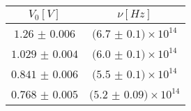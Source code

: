 \begin{tabular}{cc}
\hline
	$V_0[V]$ & $\nu[Hz]$\\ 
\hline
	$1.26$ $\pm$ $0.006$ & $(6.7$ $\pm$ $0.1)\times 10^{14}$ \\
	$1.029$ $\pm$ $0.004$ & $(6.0$ $\pm$ $0.1)\times 10^{14}$ \\
	$0.841$ $\pm$ $0.006$ & $(5.5$ $\pm$ $0.1)\times 10^{14}$ \\
	$0.768$ $\pm$ $0.005$ & $(5.2$ $\pm$ $0.09)\times 10^{14}$ \\
\hline
\end{tabular}
